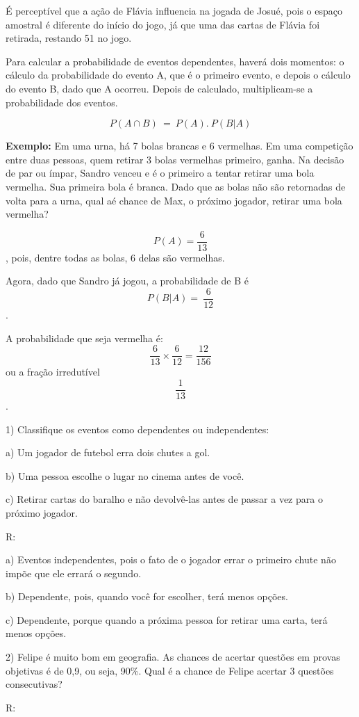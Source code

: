 É perceptível que a ação de Flávia influencia na jogada de Josué, pois o
espaço amostral é diferente do início do jogo, já que uma das cartas de
Flávia foi retirada, restando 51 no jogo.

Para calcular a probabilidade de eventos dependentes, haverá dois
momentos: o cálculo da probabilidade do evento A, que é o primeiro
evento, e depois o cálculo do evento B, dado que A ocorreu. Depois de
calculado, multiplicam-se a probabilidade dos eventos.

\[P(A \cap B)\  = \ P(A).\ P(B|A)\]

\textbf{Exemplo:} Em uma urna, há 7 bolas brancas e 6 vermelhas. Em uma
competição entre duas pessoas, quem retirar 3 bolas vermelhas primeiro,
ganha. Na decisão de par ou ímpar, Sandro venceu e é o primeiro a tentar
retirar uma bola vermelha. Sua primeira bola é branca. Dado que as bolas
não são retornadas de volta para a urna, qual aé chance de Max, o
próximo jogador, retirar uma bola vermelha?

\[P(A) = \frac{6}{13}\], pois, dentre todas as bolas, 6 delas são
vermelhas.

Agora, dado que Sandro já jogou, a probabilidade de B é
\[P(B|A) = \ \frac{6}{12}\].

A probabilidade que seja vermelha é:
\[\frac{6}{13} \times \frac{6}{12} = \frac{12}{156}\] ou a fração
irredutível \[\frac{1}{13}\].


1) Classifique os eventos como dependentes ou independentes:

a) Um jogador de futebol erra dois chutes a gol.

b) Uma pessoa escolhe o lugar no cinema antes de você.

c) Retirar cartas do baralho e não devolvê-las antes de passar a vez
para o próximo jogador.

R:

a) Eventos independentes, pois o fato de o jogador errar o primeiro
chute não impõe que ele errará o segundo.

b) Dependente, pois, quando você for escolher, terá menos opções.

c) Dependente, porque quando a próxima pessoa for retirar uma carta,
terá menos opções.

2) Felipe é muito bom em geografia. As chances de acertar questões em
provas objetivas é de 0,9, ou seja, 90\%. Qual é a chance de Felipe
acertar 3 questões consecutivas?

R:

